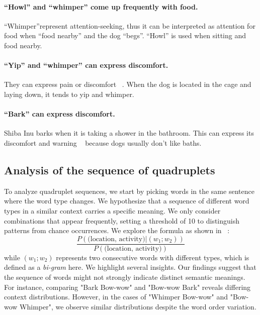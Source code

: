 \paragraph{``Howl'' and ``whimper'' come up frequently with food.} ``Whimper''represent attention-seeking, thus it can be interpreted as attention for food when ``food nearby'' and the dog ``begs''. ``Howl'' is used when sitting and food nearby. 
\paragraph{``Yip'' and ``whimper'' can express discomfort.}  They can express pain or discomfort ~\cite{yeon2007vocal,web2018yip}. When the dog is located in the cage and laying down, it tends to yip and whimper.  
\paragraph{``Bark'' can express discomfort.} Shiba Inu barks when it is taking a shower in the bathroom. This can express its discomfort and warning ~\cite{yeon2007vocal} because dogs usually don't like baths. 



\subsection{Analysis of the sequence of quadruplets} 
To analyze quadruplet sequences, we start by picking words in the same sentence where the word type changes. We hypothesize that a sequence of different word types in a similar context carries a specific meaning. We only consider combinations that appear frequently, setting a threshold of 10 to distinguish patterns from chance occurrences. We explore the formula as shown in ~:
\begin{equation}
\frac{P (\text{(location, activity)}| (w_1;w_2))}{P(\text{(location, activity)})}
\end{equation}
while $(w_1;w_2)$ represents two consecutive words with different types, which is defined as a \textit{bi-gram} here. We highlight several insights. Our findings suggest that the sequence of words might not strongly indicate distinct semantic meanings. For instance, comparing "Bark Bow-wow" and "Bow-wow Bark" reveals differing context distributions. However, in the cases of "Whimper Bow-wow" and "Bow-wow Whimper", we observe similar distributions despite the word order variation.

